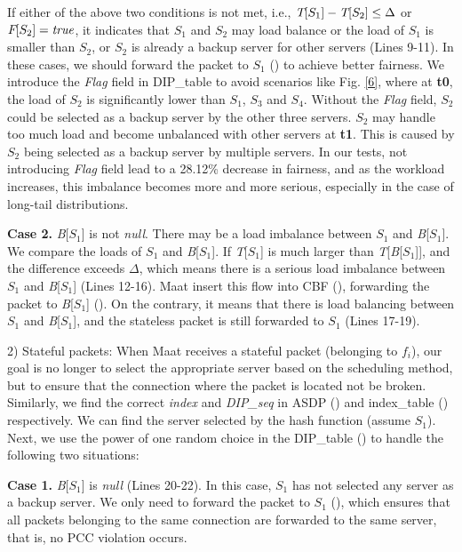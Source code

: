 {If either of the above two conditions is not met, i.e., $\emph{T}[\emph{$S_1$}] - \emph{T}[\emph{$S_2$}] \leq \Delta$ or $\emph{F}[\emph{$S_2$}] = \emph{true}$, it indicates that \emph{$S_1$} and \emph{$S_2$} may load balance or the load of \emph{$S_1$} is smaller than \emph{$S_2$}, or \emph{$S_2$} is already a backup server for other servers (Lines 9-11). In these cases, we should forward the packet to \emph{$S_1$} () to achieve better fairness. We introduce the \emph{Flag} field in DIP_table to avoid scenarios like Fig. \ref{6}, where at \textbf{t0}, the load of \emph{$S_2$} is significantly lower than \emph{$S_1$}, \emph{$S_3$} and \emph{$S_4$}. Without the \emph{Flag} field, \emph{$S_2$} could be selected as a backup server by the other three servers. \emph{$S_2$} may handle too much load and become unbalanced with other servers at \textbf{t1}. This is caused by \emph{$S_2$} being selected as a backup server by multiple servers. In our tests, not introducing \emph{Flag} field lead to a 28.12\% decrease in fairness, and as the workload increases, this imbalance becomes more and more serious, especially in the case of long-tail distributions.

\textbf{Case 2.} \emph{B}[\emph{$S_1$}] is not \emph{null}. There may be a load imbalance between \emph{$S_1$} and \emph{B}[\emph{$S_1$}]. We compare the loads of \emph{$S_1$} and \emph{B}[\emph{$S_1$}]. If \emph{T}[\emph{$S_1$}] is much larger than \emph{T}[\emph{B}[\emph{$S_1$}]], and the difference exceeds $\Delta$, which means there is a serious load imbalance between \emph{$S_1$} and \emph{B}[\emph{$S_1$}] (Lines 12-16). Maat insert this flow into CBF (), forwarding the packet to \emph{B}[\emph{$S_1$}] (). On the contrary, it means that there is load balancing between \emph{$S_1$} and \emph{B}[\emph{$S_1$}], and the stateless packet is still forwarded to {\emph{$S_1$}} (Lines 17-19).

2) Stateful packets: When Maat receives a stateful packet (belonging to \emph{$f_i$}), our goal is no longer to select the appropriate server based on the scheduling method, but to ensure that the connection where the packet is located not be broken. Similarly, we find the correct \emph{index} and \emph{DIP_seq} in ASDP () and index_table () respectively. We can find the server selected by the hash function (assume \emph{$S_1$}). Next, we use the power of one random choice in the DIP_table  () to handle the following two situations:

\textbf{Case 1.} \emph{B}[\emph{$S_1$}] is \emph{null} (Lines 20-22). In this case, \emph{$S_1$} has not selected any server as a backup server. We only need to forward the packet to \emph{$S_1$} (), which ensures that all packets belonging to the same connection are forwarded to the same server, that is, no PCC violation occurs.


}
